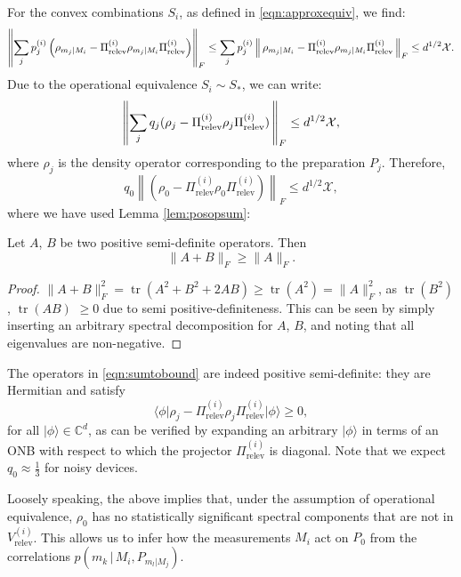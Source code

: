 For the convex combinations $S_i$, as defined in \ref{eqn:approxequiv}, we find:
\begin{equation*}
\left\|\sum_j p_j^{(i)}\left(\rho_{m_j\vert M_i}-\Pi_{\text{relev}}^{(i)}\rho_{m_j\vert M_i}\Pi_{\text{relev}}^{(i)}\right)\right\|_F \leq \sum_j p_j^{(i)}\left\|\thinspace\rho_{m_j\vert M_i}-\Pi_{\text{relev}}^{(i)}\rho_{m_j\vert M_i}\Pi_{\text{relev}}^{(i)}\thinspace\right\|_F \leq d^{1/2}\mathcal{X}.
\end{equation*}
Due to the operational equivalence $S_i\sim S_{*}$, we can write:
\begin{equation*}
\left\|\sum_j q_j(\rho_{j}-\Pi_{\text{relev}}^{(i)}\rho_{j}\Pi_{\text{relev}}^{(i)})\thinspace\right\|_F \leq d^{1/2}\mathcal{X},
\end{equation*}
where $\rho_{j}$ is the density operator corresponding to the preparation $P_j$.
Therefore,
\begin{equation}
\label{eqn:sumtobound}
q_0\left\|(\rho_{0}-\Pi_{\text{relev}}^{(i)}\rho_{0}\Pi_{\text{relev}}^{(i)})\right\|_F \leq d^{1/2}\mathcal{X},
\end{equation}
where we have used Lemma \ref{lem:posopsum}:
\begin{lemma}
\label{lem:posopsum}
Let $A$, $B$ be two positive semi-definite operators. Then
\begin{equation*}
\|A+B\|_F \geq \|A\|_F.
\end{equation*}
\end{lemma}
\begin{proof}
$\|A+B\|_F^2=\operatorname{tr}(A^2+B^2+2AB)\geq \operatorname{tr}(A^2)=\|A\|_F^2$, as $\operatorname{tr}(B^2)$, $\operatorname{tr}(AB)$ $\geq 0$ due to semi positive-definiteness. This can be seen by simply inserting an arbitrary spectral decomposition for $A$, $B$, and noting that all eigenvalues are non-negative.
\end{proof}
The operators in \ref{eqn:sumtobound} are indeed positive semi-definite: they are Hermitian and satisfy
\begin{equation*}
\langle \phi \vert \rho_{j}-\Pi_{\text{relev}}^{(i)}\rho_{j}\Pi_{\text{relev}}^{(i)} \vert \phi \rangle \geq 0,
\end{equation*}
for all $\vert \phi\rangle\in\mathbb{C}^d$, as can be verified by expanding an arbitrary $\vert \phi \rangle $ in terms of an ONB with respect to which the projector $\Pi_{\text{relev}}^{(i)}$ is diagonal. Note that we expect $q_0\approx\frac{1}{3}$ for noisy devices.

Loosely speaking, the above implies that, under the assumption of operational equivalence, $\rho_0$ has no statistically significant spectral components that are not in $V_{\text{relev}}^{(i)}$. This allows us to infer how the measurements $M_i$ act on $P_0$ from the correlations $p(m_k \, \vert \, M_i , P_{m_l\vert M_j} )$.

